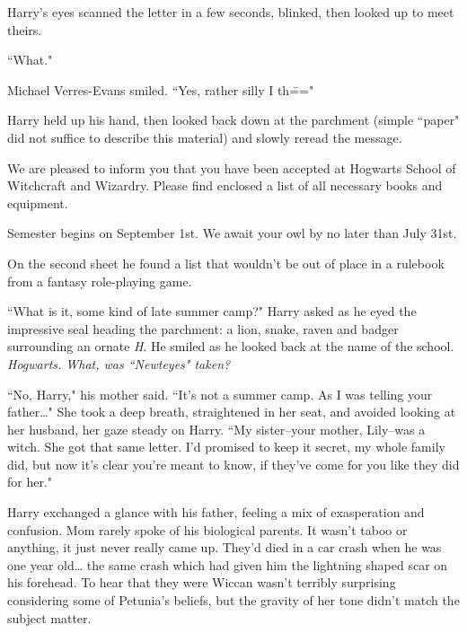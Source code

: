 Harry's eyes scanned the letter in a few seconds, blinked, then looked up to meet theirs.

``What."

Michael Verres-Evans smiled. ``Yes, rather silly I th\==="

Harry held up his hand, then looked back down at the parchment (simple ``paper" did not suffice to describe this material) and slowly reread the message.

\begin{writtenNote}

We are pleased to inform you that you have been accepted at Hogwarts School of Witchcraft and Wizardry. Please find enclosed a list of all necessary books and equipment.

Semester begins on September 1st. We await your owl by no later than July 31st.


\end{writtenNote}

On the second sheet he found a list that wouldn't be out of place in a rulebook from a fantasy role-playing game.

``What is it, some kind of late summer camp?" Harry asked as he eyed the impressive seal heading the parchment: a lion, snake, raven and badger surrounding an ornate \emph{H}. He smiled as he looked back at the name of the school. \emph{Hogwarts. What, was ``Newteyes" taken?}

``No, Harry," his mother said. ``It's not a summer camp. As I was telling your father{\ldots}" She took a deep breath, straightened in her seat, and avoided looking at her husband, her gaze steady on Harry. ``My sister\---your mother, Lily\---was a witch. She got that same letter. I'd promised to keep it secret, my whole family did, but now it's clear you're meant to know, if they've come for you like they did for her."

Harry exchanged a glance with his father, feeling a mix of exasperation and confusion. Mom rarely spoke of his biological parents. It wasn't taboo or anything, it just never really came up. They'd died in a car crash when he was one year old{\ldots} the same crash which had given him the lightning shaped scar on his forehead. To hear that they were Wiccan wasn't terribly surprising considering some of Petunia's beliefs, but the gravity of her tone didn't match the subject matter.

